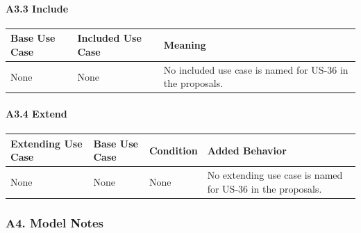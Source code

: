 \documentclass[12pt]{article}
\renewcommand{\baselinestretch}{1.5}
\begin{document}
\hypertarget{sec:a3-3-include}{}
\paragraph*{A3.3 Include}
\par\medskip

\begingroup
\small
\renewcommand{\baselinestretch}{1.0}\selectfont
\renewcommand{\arraystretch}{1.15}
\setlength{\tabcolsep}{6pt}
\begin{longtable}{|>{\raggedright\arraybackslash}p{}|>{\raggedright\arraybackslash}p{}|>{\raggedright\arraybackslash}p{}|}
\hline
\textbf{Base Use Case} & \textbf{Included Use Case} & \textbf{Meaning} \\ \hline
\endhead
None & None & No included use case is named for US-36 in the proposals. \\ \hline
\end{longtable}
\endgroup
\par\medskip

\hypertarget{sec:a3-4-extend}{}
\paragraph*{A3.4 Extend}
\par\medskip

\begingroup
\small
\renewcommand{\baselinestretch}{1.0}\selectfont
\renewcommand{\arraystretch}{1.15}
\setlength{\tabcolsep}{6pt}
\begin{longtable}{|>{\raggedright\arraybackslash}p{}|>{\raggedright\arraybackslash}p{}|>{\raggedright\arraybackslash}p{}|>{\raggedright\arraybackslash}p{}|}
\hline
\textbf{Extending Use Case} & \textbf{Base Use Case} & \textbf{Condition} & \textbf{Added Behavior} \\ \hline
\endhead
None & None & None & No extending use case is named for US-36 in the proposals. \\ \hline
\end{longtable}
\endgroup
\par\medskip

\hypertarget{sec:a4-model-notes}{}
\subsubsection*{A4. Model Notes}
\par\medskip
\end{document}

